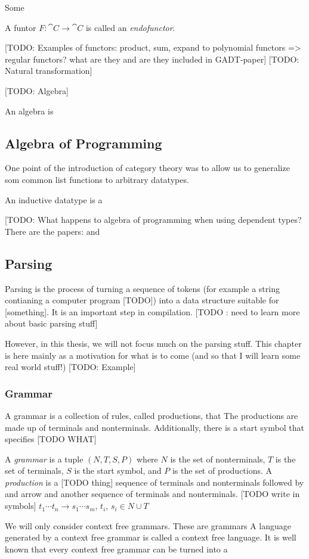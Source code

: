 \documentclass{article}
\begin{document}
Some 
\begin{Def}
  A funtor $F : \cat{C} \to \cat{C}$ is called an \emph{endofunctor}.
\end{Def}
[TODO: Examples of functors: product, sum, expand to polynomial functors => regular functors? what are they and are they included in GADT-paper]
[TODO: Natural transformation]


[TODO: Algebra]
\begin{Def}
  An algebra is 
\end{Def}
\subsection{Algebra of Programming}
One point of the introduction of category theory was to allow us to generalize som common list functions to arbitrary datatypes.

An inductive datatype is a 

[TODO: What happens to algebra of programming when using dependent types? There are the papers: \cite{gambino_hyland_2004} and \cite{gadt_semantics_2011}  
\subsection{Parsing}
Parsing is the process of turning a sequence of tokens (for example a string contianing a computer program [TODO]) into a data structure suitable for [something]. It is an important step in compilation. [TODO : need to learn more about basic parsing stuff]

However, in this thesis, we will not focus much on the parsing stuff. This chapter is here mainly as a motivation for what is to come (and so that I will learn some real world stuff!)
[TODO: Example]
\subsubsection{Grammar}
A grammar is a collection of rules, called productions, that 
The productions are made up of terminals and nonterminals.
Additionally, there is a start symbol that specifies [TODO WHAT]
\begin{Def}
  A \emph{grammar} is a tuple $(N, T, S, P)$ where $N$ is the set of nonterminals, $T$ is the set of terminals, $S$ is the start symbol, and $P$ is the set of productions. A \emph{production} is a [TODO thing] sequence of terminals and nonterminals followed by and arrow and another sequence of terminals and nonterminals. [TODO write in symbols] $t_1 \dotsb t_n \to s_1 \dotsb s_m$, $t_i$, $s_i \in N \cup T$
\end{Def}
We will only consider context free grammars. These are grammars 
A language generated by a context free grammar is called a context free language. It is well known that every context free grammar can be turned into a 
\end{document}
